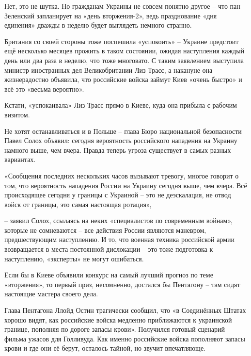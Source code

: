 Нет, это не шутка. Но гражданам Украины не совсем понятно другое – что пан
Зеленский запланирует на «день вторжения-2», ведь празднование «дня единения»
дважды в неделю будет выглядеть немного странно.

Британия со своей стороны тоже поспешила «успокоить» – Украине предстоит ещё
несколько месяцев прожить в таком состоянии, ожидая наступления каждый день или
два раза в неделю, что тоже многовато. С таким заявлением выступила министр
иностранных дел Великобритании Лиз Трасс, а накануне она жизнерадостно
объявила, что российские войска займут Киев «очень быстро» и всё это «весьма
вероятно».

Кстати, «успокаивала» Лиз Трасс прямо в Киеве, куда она прибыла с рабочим
визитом.


Не хотят останавливаться и в Польше – глава Бюро национальной безопасности
Павел Солох объявил: сегодня вероятность российского нападения на Украину
намного выше, чем вчера. Правда теперь угроза существует в самых разных
вариантах.

\begin{zznagolos}
«Сообщения последних нескольких часов вызывают тревогу, многое говорит о том,
что вероятность нападения России на Украину сегодня выше, чем вчера. Всё
происходящее сегодня у границы с Украиной – это не деэскалация, не отвод войск
от границы, это самая настоящая ротация»,	
\end{zznagolos}

– заявил Солох, ссылаясь на неких «специалистов по современным войнам», которые
не сомневаются – все действия России являются маневром, предшествующим
наступлению. И то, что военная техника российской армии возвращается в места
постоянной дислокации – это тоже подготовка к наступлению, «эксперты» не могут
ошибаться.


Если бы в Киеве объявили конкурс на самый лучший прогноз по теме «вторжения»,
то первый приз, несомненно, достался бы Пентагону – там сидят настоящие мастера
своего дела.

Глава Пентагона Ллойд Остин трагически сообщил, что «в Соединённых Штатах
хорошо видят, как российские войска медленно приближаются к украинской границе,
пополняя по дороге запасы крови». Получился готовый сценарий фильма ужасов для
Голливуда. Как именно российские войска пополняют запасы крови и где они её
берут, осталось тайной, но звучит впечатляюще.

